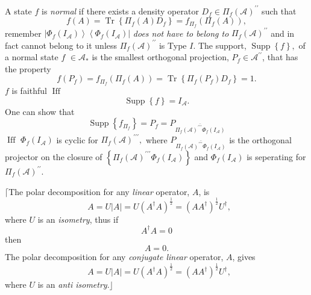 \documentclass[aps,preprint]{revtex4}%
\begin{document}
A\emph{ }state $f$ is \emph{normal} if there exists a density operator
$D_{f}\in\Pi_{f}\left(  \mathcal{A}\right)  ^{\prime\prime}$ such that
\begin{equation}
f\left(  A\right)  =\operatorname{Tr}\left\{  \Pi_{f}\left(  A\right)
D_{f}\right\}  =f_{\Pi_{f}}\left(  \Pi_{f}\left(  A\right)  \right)  ,
\end{equation}
remember $\left\vert \Phi_{f}\left(  I_{\mathcal{A}}\right)  \right\rangle
\left\langle \Phi_{f}\left(  I_{\mathcal{A}}\right)  \right\vert $ \emph{does
not have to belong to} $\Pi_{f}\left(  \mathcal{A}\right)  ^{\prime\prime}$
and in fact cannot belong to it unless $\Pi_{f}\left(  \mathcal{A}\right)
^{\prime\prime}$ is Type $I.$ The support, $\operatorname{Supp}\left\{
f\right\}  ,$ of a normal state $f$ $\in\mathcal{A}_{\ast}$ is the smallest
orthogonal projection, $P_{f}\in\mathcal{A}^{\prime\prime}$, that has the
property
\begin{equation}
f\left(  P_{f}\right)  =f_{\Pi_{f}}\left(  \Pi_{f}\left(  A\right)  \right)
=\operatorname{Tr}\left\{  \Pi_{f}\left(  P_{f}\right)  D_{f}\right\}  =1.
\end{equation}
$f$ is faithful $\operatorname*{Iff}$
\begin{equation}
\operatorname{Supp}\left\{  f\right\}  =I_{\mathcal{A}}.
\end{equation}
One can show that
\begin{equation}
\operatorname{Supp}\left\{  f_{\Pi_{f}}\right\}  =P_{f}=P_{\overline{\Pi
_{f}\left(  \mathcal{A}\right)  ^{\prime\prime\prime}\Phi_{f}\left(
I_{\mathcal{A}}\right)  }}%
\end{equation}
$\operatorname*{Iff}$ $\Phi_{f}\left(  I_{\mathcal{A}}\right)  $ is cyclic for
$\Pi_{f}\left(  \mathcal{A}\right)  ^{\prime\prime\prime},$ where
$P_{\overline{\Pi_{f}\left(  \mathcal{A}\right)  ^{\prime\prime\prime}\Phi
_{f}\left(  I_{\mathcal{A}}\right)  }}$ is the orthogonal projector on the
closure of $\left\{  \Pi_{f}\left(  \mathcal{A}\right)  ^{\prime\prime\prime
}\Phi_{f}\left(  I_{\mathcal{A}}\right)  \right\}  $ and $\Phi_{f}\left(
I_{\mathcal{A}}\right)  $ is seperating for $\Pi_{f}\left(  \mathcal{A}%
\right)  ^{\prime\prime}.$

$\lceil$The polar decomposition for any \emph{linear} operator, $A$, is
\begin{equation}
\text{ }A=U\left\vert A\right\vert =U\left(  A^{\dagger}A\right)  ^{\frac
{1}{2}}=\left(  AA^{\dagger}\right)  ^{\frac{1}{2}}U^{\dagger},
\end{equation}
where $U$ is an \emph{isometry}, thus if
\begin{equation}
A^{\dagger}A=0
\end{equation}
then
\begin{equation}
A=0.
\end{equation}
The polar decomposition for any \emph{conjugate linear} operator, $A$, gives
\begin{equation}
\text{ }A=U\left\vert A\right\vert =U\left(  A^{\dagger}A\right)  ^{\frac
{1}{2}}=\left(  AA^{\dagger}\right)  ^{\frac{1}{2}}U^{\dagger},
\end{equation}
where $U$ is an \emph{anti isometry}.$\rfloor$
\end{document}
